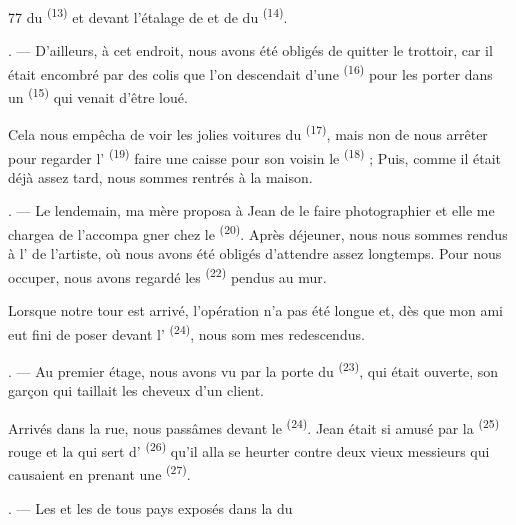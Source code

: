 \begin{VUpage}[79]{77}
\VUcontinue
{} du  \textsuperscript{(13)} et devant\nl
l'étalage de  et de  du \cc
{} \textsuperscript{(14)}.

. --- D'ailleurs, à cet endroit, nous avons été\nl
obligés de quitter le trottoir, car il était encombré par\nl
des colis que l'on descendait d'une \cc
{} \textsuperscript{(16)} pour les porter dans un  \textsuperscript{(15)}\nl
qui venait d'être loué.

\VUblancAlinea
Cela nous empêcha de voir les jolies voitures du\nl
{} \textsuperscript{(17)}, mais non de nous arrêter pour\nl
regarder l' \textsuperscript{(19)} faire une caisse pour son\nl
voisin le \cc
{} \textsuperscript{(18)} ; Puis, comme il était déjà assez tard, nous\nl
sommes rentrés à la maison.

. --- Le lendemain, ma mère proposa à Jean de le\nl
faire photographier et elle me chargea de l'accompa\cc
gner chez le  \textsuperscript{(20)}. Après déjeuner, nous\nl
nous sommes rendus à l' de l'artiste, où nous\nl
avons été obligés d'attendre assez longtemps. Pour\nl
nous occuper, nous avons regardé les  \textsuperscript{(22)}\nl
pendus au mur.

\VUblancAlinea
Lorsque notre tour est arrivé, l'opération n'a pas\nl
été longue et, dès que mon ami eut fini de poser\nl
devant l' \textsuperscript{(24)}, nous som\cc
mes redescendus.

. --- Au premier étage, nous avons vu par la porte\nl
du  \textsuperscript{(23)}, qui était ouverte, son garçon qui\nl
taillait les cheveux d'un client.

\VUblancAlinea
Arrivés dans la rue, nous passâmes devant le\nl
{} \textsuperscript{(24)}. Jean était si amusé par la\nl
{} \textsuperscript{(25)} rouge et la  qui sert\nl
d' \textsuperscript{(26)} qu'il alla se heurter contre deux vieux\nl
messieurs qui causaient en prenant une  \textsuperscript{(27)}.

. --- Les  et les \nl
{} de tous pays exposés dans la  du
\parplein
\end{VUpage}

